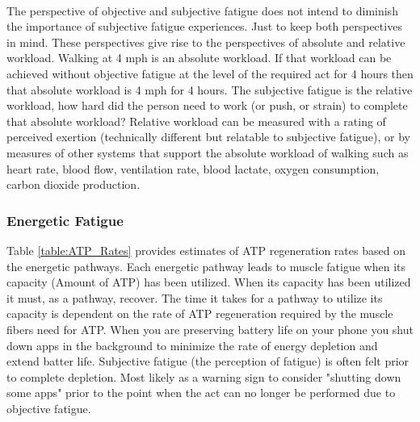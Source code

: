 \paragraph{}
The perspective of objective and subjective fatigue does not intend to diminish the importance of subjective fatigue experiences. Just to keep both perspectives in mind. These perspectives give rise to the perspectives of absolute and relative workload. Walking at 4 mph is an absolute workload. If that workload can be achieved without objective fatigue at the level of the required act for 4 hours then that absolute workload is 4 mph for 4 hours. The subjective fatigue is the relative workload, how hard did the person need to work (or push, or strain) to complete that absolute workload? Relative workload can be measured with a rating of perceived exertion (technically different but relatable to subjective fatigue), or by measures of other systems that support the absolute workload of walking such as heart rate, blood flow, ventilation rate, blood lactate, oxygen consumption, carbon dioxide production. 

\subsubsection{Energetic Fatigue}

Table \ref{table:ATP_Rates} provides estimates of ATP regeneration rates based on the energetic pathways. Each energetic pathway leads to muscle fatigue when its capacity (Amount of ATP) has been utilized. When its capacity has been utilized it must, as a pathway, recover. The time it takes for a pathway to utilize its capacity is dependent on the rate of ATP regeneration required by the muscle fibers need for ATP. When you are preserving battery life on your phone you shut down apps in the background to minimize the rate of energy depletion and extend batter life. Subjective fatigue (the perception of fatigue) is often felt prior to complete depletion. Most likely as a warning sign to consider "shutting down some apps" prior to the point when the act can no longer be performed due to objective fatigue. 

